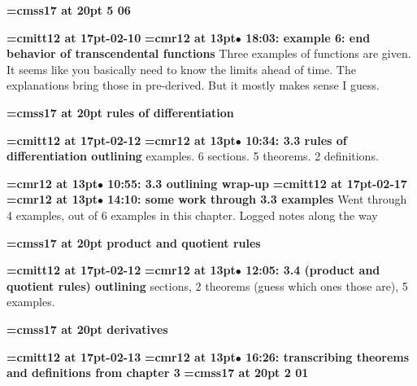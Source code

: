 {\medskip\noindent\bf\font\titlefont=cmss17 at 20pt 5 06}\medskip

{\medskip\noindent\bf\font\titlefont=cmitt12 at 17pt-02-10}\medskip
{\smallskip\noindent\bf\font\titlefont=cmr12 at 13pt\titlefont $\bullet$ 18:03: example 6: end behavior of transcendental functions}\smallskip
Three examples of functions are given. It seems like you basically need to know the limits ahead of time. The explanations bring those in pre-derived. But it mostly makes sense I guess.
\par

{\medskip\noindent\bf\font\titlefont=cmss17 at 20pt rules of differentiation}\medskip

{\medskip\noindent\bf\font\titlefont=cmitt12 at 17pt-02-12}\medskip
{\smallskip\noindent\bf\font\titlefont=cmr12 at 13pt\titlefont $\bullet$ 10:34: 3.3 rules of differentiation outlining} examples. 6 sections. 5 theorems. 2 definitions.
\par

{\smallskip\noindent\bf\font\titlefont=cmr12 at 13pt\titlefont $\bullet$ 10:55: 3.3 outlining wrap-up}\smallskip
{\medskip\noindent\bf\font\titlefont=cmitt12 at 17pt-02-17}\medskip
{\smallskip\noindent\bf\font\titlefont=cmr12 at 13pt\titlefont $\bullet$ 14:10: some work through 3.3 examples}\smallskip
Went through 4 examples, out of 6 examples in this chapter. Logged notes along the way
\par

{\medskip\noindent\bf\font\titlefont=cmss17 at 20pt product and quotient rules}\medskip

{\medskip\noindent\bf\font\titlefont=cmitt12 at 17pt-02-12}\medskip
{\smallskip\noindent\bf\font\titlefont=cmr12 at 13pt\titlefont $\bullet$ 12:05: 3.4 (product and quotient rules) outlining} sections, 2 theorems (guess which ones those are), 5 examples.
\par

{\medskip\noindent\bf\font\titlefont=cmss17 at 20pt derivatives}\medskip

{\medskip\noindent\bf\font\titlefont=cmitt12 at 17pt-02-13}\medskip
{\smallskip\noindent\bf\font\titlefont=cmr12 at 13pt\titlefont $\bullet$ 16:26: transcribing theorems and definitions from chapter 3}\smallskip
{}
{\medskip\noindent\bf\font\titlefont=cmss17 at 20pt 2 01}\medskip

